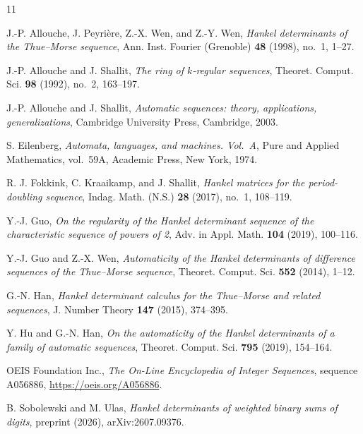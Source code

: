 \documentclass{amsart}
\theoremstyle{definition}
\theoremstyle{remark}
\numberwithin{equation}{section}
\begin{document}
\begin{thebibliography}{11}

J.-P. Allouche, J. Peyri\`ere, Z.-X. Wen, and Z.-Y. Wen, \emph{Hankel determinants of the Thue--Morse sequence}, Ann. Inst. Fourier (Grenoble) \textbf{48} (1998), no.~1, 1--27.

J.-P. Allouche and J. Shallit, \emph{The ring of $k$-regular sequences}, Theoret. Comput. Sci. \textbf{98} (1992), no.~2, 163--197.

J.-P. Allouche and J. Shallit, \emph{Automatic sequences: theory, applications, generalizations}, Cambridge University Press, Cambridge, 2003.

S. Eilenberg, \emph{Automata, languages, and machines. Vol.~A}, Pure and Applied Mathematics, vol.~59A, Academic Press, New York, 1974.

R. J. Fokkink, C. Kraaikamp, and J. Shallit, \emph{Hankel matrices for the period-doubling sequence}, Indag. Math. (N.S.) \textbf{28} (2017), no.~1, 108--119.

Y.-J. Guo, \emph{On the regularity of the Hankel determinant sequence of the characteristic sequence of powers of 2}, Adv. in Appl. Math. \textbf{104} (2019), 100--116.

Y.-J. Guo and Z.-X. Wen, \emph{Automaticity of the Hankel determinants of difference sequences of the Thue--Morse sequence}, Theoret. Comput. Sci. \textbf{552} (2014), 1--12.

G.-N. Han, \emph{Hankel determinant calculus for the Thue--Morse and related sequences}, J. Number Theory \textbf{147} (2015), 374--395.

Y. Hu and G.-N. Han, \emph{On the automaticity of the Hankel determinants of a family of automatic sequences}, Theoret. Comput. Sci. \textbf{795} (2019), 154--164.

OEIS Foundation Inc., \emph{The On-Line Encyclopedia of Integer Sequences}, sequence A056886, \url{https://oeis.org/A056886}.

B. Sobolewski and M. Ulas, \emph{Hankel determinants of weighted binary sums of digits}, preprint (2026), arXiv:2607.09376.

\end{thebibliography}
\end{document}

